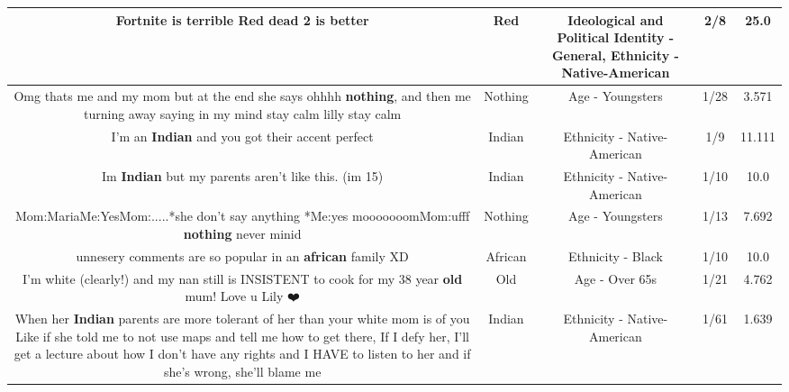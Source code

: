 \documentclass[11pt]{article}
\newlength\mylength
\begin{document}
\begin{center}
\begin{longtable}{|C{.65\mylength}|C{.30\mylength}|C{.12\mylength}|C{.12\mylength}|C{.12\mylength}|}
  \small Fortnite is terrible \textbf{R\textbf{ed}} dead 2 is better\normalsize   & Red &  Ideological and Political Identity - General, Ethnicity - Native-American & 2/8 & 25.0 \\  \hline
  \small Omg thats me and my mom but at the end she says ohhhh \textbf{nothing}, and then me turning away saying in my mind stay calm lilly stay calm\normalsize   & Nothing & Age - Youngsters & 1/28 & 3.571 \\  \hline
  \small I'm an \textbf{Indian} and you got their accent perfect\normalsize   & Indian & Ethnicity - Native-American & 1/9 & 11.111 \\  \hline
  \small Im \textbf{Indian} but my parents aren't like this. (im 15)\normalsize   & Indian & Ethnicity - Native-American & 1/10 & 10.0 \\  \hline
  \small Mom:MariaMe:YesMom:.....*she don't say anything *Me:yes mooooooomMom:ufff \textbf{nothing} never minid\normalsize   & Nothing & Age - Youngsters & 1/13 & 7.692 \\  \hline
  \small unnesery comments are so popular in an \textbf{african} family XD\normalsize   & African & Ethnicity - Black & 1/10 & 10.0 \\  \hline
  \small I'm white (clearly!) and my nan still is INSISTENT to cook for my 38 year \textbf{old} mum! Love u Lily ❤️\normalsize   & Old & Age - Over 65s & 1/21 & 4.762 \\  \hline
  \small When her \textbf{Indian} parents are more tolerant of her than your white mom is of you Like if she told me to not use maps and tell me how to get there, If I defy her, I'll get a lecture about how I don't have any rights and I HAVE to listen to her and if she's wrong, she'll blame me\normalsize   & Indian & Ethnicity - Native-American & 1/61 & 1.639 \\  \hline

\end{longtable}
\end{center}
\end{document}
